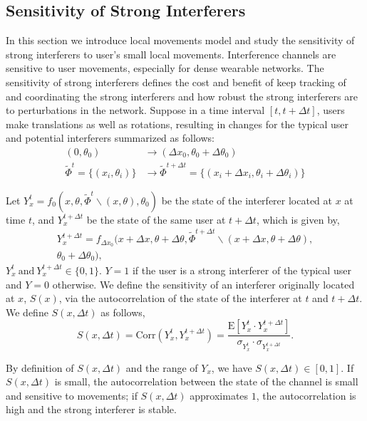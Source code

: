 \documentclass[10pt, conference, letterpaper]{IEEEtran}
\begin{document}
\subsection{Sensitivity of Strong Interferers}
In this section we introduce local movements model and study the sensitivity of strong interferers to user's small local movements.
Interference channels are sensitive to user movements, especially for dense wearable networks. The sensitivity of strong interferers defines the cost and benefit of keep tracking of and coordinating the strong interferers and how robust the strong interferers are to perturbations in the network. Suppose in a time interval $[t, t+ \Delta t]$, users make translations as well as rotations, resulting in changes for the typical user and potential interferers summarized as follows:
\begin{equation*}
\begin{split}
(0,\theta_0)&\rightarrow(\Delta x_0, \theta_0 + \Delta\theta_0) \\
\tilde{\Phi}^{t}=\{(x_i, \theta_i)\}&\rightarrow\tilde{\Phi}^{t+\Delta t}=\{(x_i+\Delta x_i, \theta_i + \Delta\theta_i)\}
\end{split}
\end{equation*}

Let $Y_x^t=f_0(x, \theta, \tilde{\Phi}^t\backslash (x, \theta), \theta_0)$ be the state of the interferer located at $x$ at time $t$, and $Y_x^{t+\Delta t}$ be the state of the same user at $t+\Delta t$, which is given by,
\begin{multline*}
Y_{x}^{t+\Delta t} = f_{\Delta x_0}(x+\Delta x, \theta + \Delta\theta, \tilde{\Phi}^{t+\Delta t}\backslash (x+\Delta x, \theta + \Delta\theta), \\
\theta_0 + \Delta\theta_0),
\end{multline*}
$Y_x^t \mathrm{~and~} Y_{x}^{t+\Delta t} \in \{0,1\}$. $Y = 1$ if the user is a strong interferer of the typical user and $Y = 0$ otherwise. We define the sensitivity of an interferer originally located at $x$, $S(x)$, via the autocorrelation of the state of the interferer at $t$ and $t+\Delta t$. We define $S(x, \Delta t)$ as follows, 
\begin{equation}
S(x, \Delta t)
=\mathrm{Corr}(Y_x^t, Y_x^{t+\Delta t})
=\frac{\mathrm{E}[Y_x^t\cdot Y_x^{t + \Delta t}]}{\sigma_{Y_x^t}\cdot \sigma_{Y_x^{t+\Delta t}}}.
\end{equation}

By definition of $S(x, \Delta t)$ and the range of $Y_x$, we have $S(x, \Delta t)\in [0,1]$. If $S(x, \Delta t)$ is small, the autocorrelation between the state of the channel is small and sensitive to movements; if $S(x, \Delta t)$ approximates $1$, the autocorrelation is high and the strong interferer is stable.
\end{document}
